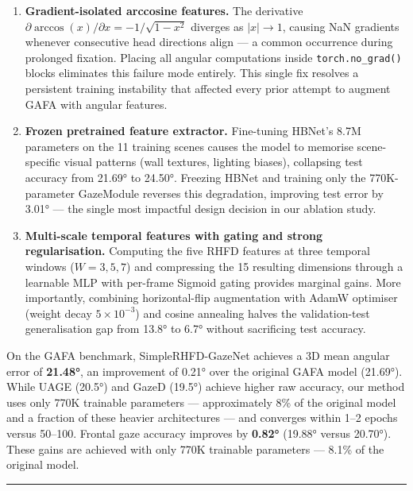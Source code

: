 \documentclass[
]{article}
\begin{document}
\begin{enumerate}
\def\labelenumi{\arabic{enumi}.}
\item
  \textbf{Gradient-isolated arccosine features.} The derivative
  \(\partial \arccos(x)/\partial x = -1/\sqrt{1-x^2}\) diverges as
  \(|x| \to 1\), causing NaN gradients whenever consecutive head
  directions align --- a common occurrence during prolonged fixation.
  Placing all angular computations inside \texttt{torch.no\_grad()}
  blocks eliminates this failure mode entirely. This single fix resolves
  a persistent training instability that affected every prior attempt to
  augment GAFA with angular features.
\item
  \textbf{Frozen pretrained feature extractor.} Fine-tuning HBNet's 8.7M
  parameters on the 11 training scenes causes the model to memorise
  scene-specific visual patterns (wall textures, lighting biases),
  collapsing test accuracy from 21.69° to 24.50°. Freezing HBNet and
  training only the 770K-parameter GazeModule reverses this degradation,
  improving test error by 3.01° --- the single most impactful design
  decision in our ablation study.
\item
  \textbf{Multi-scale temporal features with gating and strong
  regularisation.} Computing the five RHFD features at three temporal
  windows (\(W = 3, 5, 7\)) and compressing the 15 resulting dimensions
  through a learnable MLP with per-frame Sigmoid gating provides
  marginal gains. More importantly, combining horizontal-flip
  augmentation with AdamW optimiser (weight decay \(5 \times 10^{-3}\))
  and cosine annealing halves the validation-test generalisation gap
  from 13.8° to 6.7° without sacrificing test accuracy.
\end{enumerate}

On the GAFA benchmark, SimpleRHFD-GazeNet achieves a 3D mean angular
error of \textbf{21.48°}, an improvement of 0.21° over the original GAFA
model (21.69°). While UAGE (20.5°) and GazeD (19.5°) achieve higher raw
accuracy, our method uses only 770K trainable parameters ---
approximately 8\% of the original model and a fraction of these heavier
architectures --- and converges within 1--2 epochs versus 50--100.
Frontal gaze accuracy improves by \textbf{0.82°} (19.88° versus 20.70°).
These gains are achieved with only 770K trainable parameters --- 8.1\%
of the original model.

\begin{center}\rule{0.5\linewidth}{0.5pt}\end{center}
\end{document}
